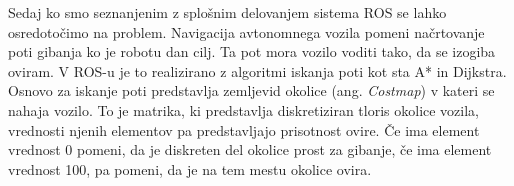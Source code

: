 %
%
%

Sedaj ko smo seznanjenim z splošnim delovanjem sistema ROS se lahko osredotočimo na problem. Navigacija avtonomnega vozila pomeni načrtovanje poti gibanja ko je robotu dan cilj. Ta pot mora vozilo voditi tako, da se izogiba oviram. V ROS-u je to realizirano z algoritmi iskanja poti kot sta A* in Dijkstra. Osnovo za iskanje poti predstavlja zemljevid okolice (ang. \textit{Costmap}) v kateri se nahaja vozilo. To je matrika, ki predstavlja diskretiziran tloris okolice vozila, vrednosti njenih elementov pa predstavljajo prisotnost ovire. Če ima element vrednost 0 pomeni, da je diskreten del okolice prost za gibanje, če ima element vrednost 100, pa pomeni, da je na tem mestu okolice ovira.


